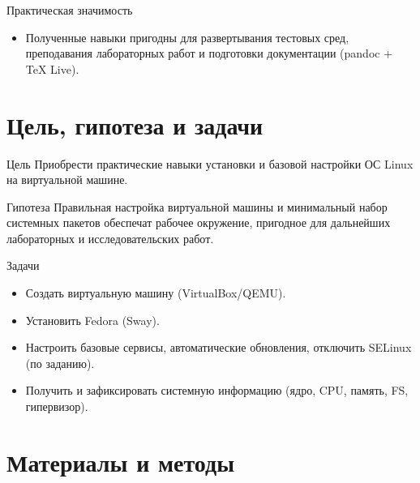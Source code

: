 \documentclass[
  ignorenonframetext,
  aspectratio=169,
  russian,
  aspectratio=169]{beamer}
\providecommand{\tightlist}{%
  \setlength{\itemsep}{0pt}\setlength{\parskip}{0pt}}
\begin{document}
\begin{frame}{Практическая значимость}
\label{ux43fux440ux430ux43aux442ux438ux447ux435ux441ux43aux430ux44f-ux437ux43dux430ux447ux438ux43cux43eux441ux442ux44c}
\begin{itemize}[<+->]
\tightlist
\item
  Полученные навыки пригодны для развертывания тестовых сред,
  преподавания лабораторных работ и подготовки документации (pandoc +
  TeX Live).
\end{itemize}
\end{frame}

\section{Цель, гипотеза и
задачи}\label{ux446ux435ux43bux44c-ux433ux438ux43fux43eux442ux435ux437ux430-ux438-ux437ux430ux434ux430ux447ux438}

\begin{frame}{Цель}
\label{ux446ux435ux43bux44c}
Приобрести практические навыки установки и базовой настройки ОС Linux на
виртуальной машине.
\end{frame}

\begin{frame}{Гипотеза}
\label{ux433ux438ux43fux43eux442ux435ux437ux430}
Правильная настройка виртуальной машины и минимальный набор системных
пакетов обеспечат рабочее окружение, пригодное для дальнейших
лабораторных и исследовательских работ.
\end{frame}

\begin{frame}{Задачи}
\label{ux437ux430ux434ux430ux447ux438}
\begin{itemize}[<+->]
\tightlist
\item
  Создать виртуальную машину (VirtualBox/QEMU).
\item
  Установить Fedora (Sway).
\item
  Настроить базовые сервисы, автоматические обновления, отключить
  SELinux (по заданию).
\item
  Получить и зафиксировать системную информацию (ядро, CPU, память, FS,
  гипервизор).
\end{itemize}
\end{frame}

\section{Материалы и
методы}\label{ux43cux430ux442ux435ux440ux438ux430ux43bux44b-ux438-ux43cux435ux442ux43eux434ux44b}
\end{document}
